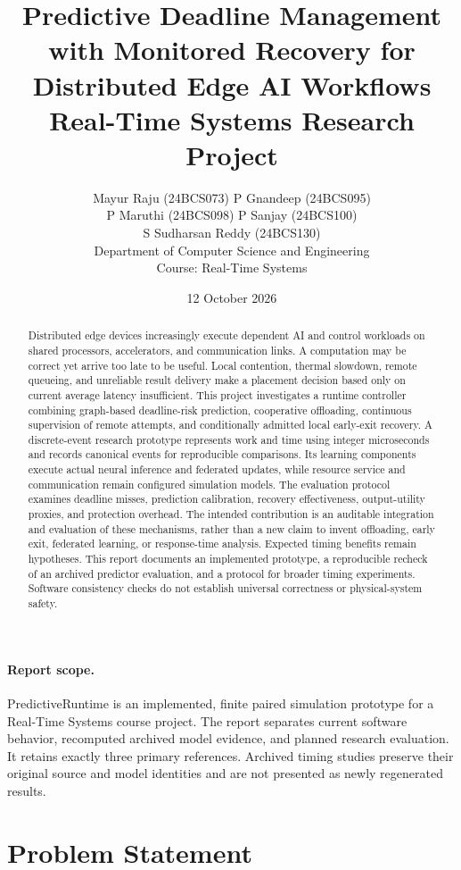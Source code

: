 \documentclass[11pt,a4paper]{article}
\title{\textbf{Predictive Deadline Management with Monitored Recovery for Distributed Edge AI Workflows}\\[0.6em]
\large Real-Time Systems Research Project}
\author{Mayur Raju (24BCS073) \quad P Gnandeep (24BCS095)\\
P Maruthi (24BCS098) \quad P Sanjay (24BCS100)\\
S Sudharsan Reddy (24BCS130)\\[0.5em]
Department of Computer Science and Engineering\\
Course: Real-Time Systems}
\date{12 October 2026}
\begin{document}
\maketitle
\begin{abstract}
Distributed edge devices increasingly execute dependent AI and control workloads
on shared processors, accelerators, and communication links. A computation may
be correct yet arrive too late to be useful. Local contention, thermal slowdown,
remote queueing, and unreliable result delivery make a placement decision based
only on current average latency insufficient. This project investigates a
runtime controller combining graph-based deadline-risk prediction, cooperative
offloading, continuous supervision of remote attempts, and conditionally
admitted local early-exit recovery. A discrete-event research prototype represents
work and time using integer microseconds and records canonical events for
reproducible comparisons. Its learning components execute actual neural
inference and federated updates, while resource service and communication remain
configured simulation models. The evaluation protocol examines deadline misses,
prediction calibration, recovery effectiveness, output-utility proxies, and
protection overhead. The intended contribution is an auditable integration and
evaluation of these mechanisms, rather than a new claim to invent offloading,
early exit, federated learning, or response-time analysis. Expected timing benefits remain hypotheses. This report documents an implemented
prototype, a reproducible recheck of an archived predictor evaluation, and a
protocol for broader timing experiments. Software consistency checks do not
establish universal correctness or physical-system safety.
\end{abstract}

\paragraph{Report scope.}
PredictiveRuntime is an implemented, finite paired simulation prototype for a
Real-Time Systems course project. The report separates current software behavior,
recomputed archived model evidence, and planned research evaluation. It retains
exactly three primary references. Archived timing studies preserve their original
source and model identities and are not presented as newly regenerated results.

\setcounter{tocdepth}{1}\newpage\tableofcontents
\newpage

\section{Problem Statement}
\end{document}
